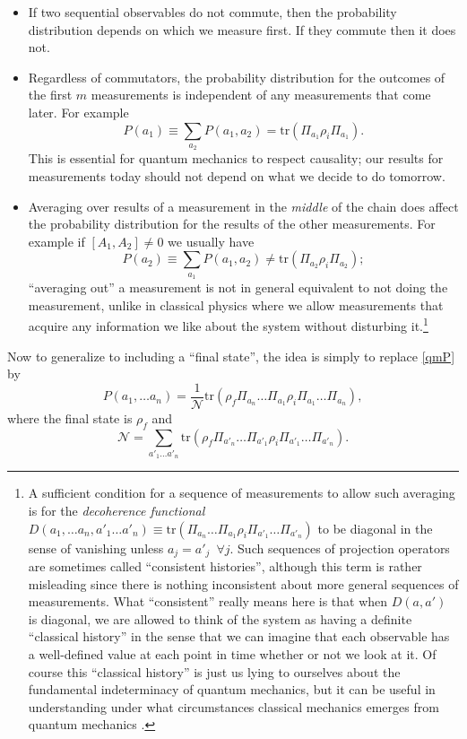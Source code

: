 \documentclass[12pt]{article}
\newcommand{\be}{\begin{equation}}
\newcommand{\ee}{\end{equation}}
\newcommand{\tr}{\mathrm{tr}}
\begin{document}
\begin{itemize}
\item If two sequential observables do not commute, then the probability distribution depends on which we measure first.  If they commute then it does not.
\item Regardless of commutators, the probability distribution for the outcomes of the first $m$ measurements is independent of any measurements that come later.  For example
\be\label{qmcausal}
P(a_1)\equiv\sum_{a_2}P(a_1,a_2)=\tr \left (\Pi_{a_1}\rho_i \Pi_{a_1}\right).
\ee
This is essential for quantum mechanics to respect causality; our results for measurements today should not depend on what we decide to do tomorrow.  
\item Averaging over results of a measurement in the \textit{middle} of the chain does affect the probability distribution for the results of the other measurements.  For example if $[A_1,A_2]\neq 0$ we usually have
\be
P(a_2)\equiv \sum_{a_1} P(a_1,a_2) \neq \tr \left (\Pi_{a_2}\rho_i \Pi_{a_2}\right);
\ee
``averaging out'' a measurement is not in general equivalent to not doing the measurement, unlike in classical physics where we allow measurements that acquire any information we like about the system without disturbing it.\footnote{A sufficient condition for a sequence of measurements to allow such averaging is for the \textit{decoherence functional} $D(a_1,\ldots a_n,a'_1\ldots a'_n)\equiv \tr \left(\Pi_{a_n} \ldots \Pi_{a_1}\rho_i \Pi_{a'_1}\ldots \Pi_{a'_n}\right)$ to be diagonal in the sense of vanishing unless $a_j=a'_j\,\,\, \forall j$.  Such sequences of projection operators are sometimes called ``consistent histories'', although this term is rather misleading since there is nothing inconsistent about more general sequences of measurements.  What ``consistent'' really means here is that when $D(a,a')$ is diagonal, we are allowed to think of the system as having a definite ``classical history'' in the sense that we can imagine that each observable has a well-defined value at each point in time whether or not we look at it.  Of course this ``classical history'' is just us lying to ourselves about the fundamental indeterminacy of quantum mechanics, but it can be useful in understanding under what circumstances classical mechanics emerges from quantum mechanics \cite{GellMann:1992kh}.}  
\end{itemize}
Now to generalize to including a ``final state'', the idea is simply to replace \eqref{qmP} by 
\be\label{PqmP}
P(a_1,\ldots a_n)=\frac{1}{\mathcal{N}}\tr \left(\rho_f\Pi_{a_n} \ldots \Pi_{a_1}\rho_i \Pi_{a_1}\ldots \Pi_{a_n}\right),
\ee
where the final state is $\rho_f$ \cite{PhysRev.134.B1410} and
\be
\mathcal{N}=\sum_{a'_1\ldots a'_n}\tr \left(\rho_f\Pi_{a'_n} \ldots \Pi_{a'_1}\rho_i \Pi_{a'_1}\ldots \Pi_{a'_n}\right).
\ee
\end{document}
